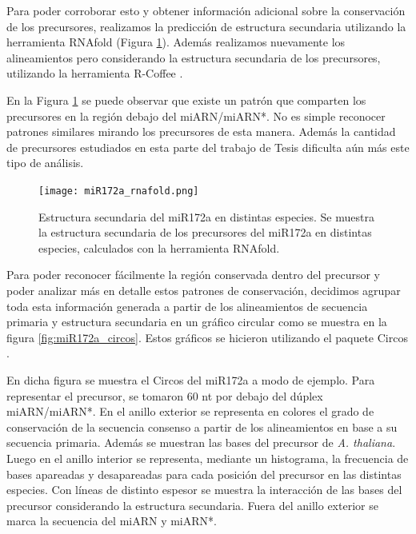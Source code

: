 Para poder corroborar esto y obtener información adicional sobre la conservación de los precursores, realizamos la predicción de estructura secundaria utilizando la herramienta RNAfold \citep{pmid22115189} (Figura \ref{fig:miR172a_rnafold}).
Además realizamos nuevamente los alineamientos pero considerando la estructura secundaria de los precursores, utilizando la herramienta R-Coffee \citep{pmid18292307}.

En la Figura \ref{fig:miR172a_rnafold} se puede observar que existe un patrón que comparten los precursores en la región debajo del miARN/miARN*.
No es simple reconocer patrones similares mirando los precursores de esta manera.
Además la cantidad de precursores estudiados en esta parte del trabajo de Tesis dificulta aún más este tipo de análisis.

\begin{landscape}
    \begin{figure}[htbp!] 
        \centering    
        \texttt{[image: miR172a\_rnafold.png]}
        \caption[Estructura secundaria del miR172a en distintas especies]{
        Estructura secundaria del miR172a en distintas especies.
        Se muestra la estructura secundaria de los precursores del miR172a en distintas especies, calculados con la herramienta RNAfold.
        }
        \label{fig:miR172a_rnafold}
    \end{figure}
\end{landscape}

Para poder reconocer fácilmente la región conservada dentro del precursor y poder analizar más en detalle estos patrones de conservación, decidimos agrupar toda esta información
 generada a partir de los alineamientos de secuencia primaria y estructura secundaria en un gráfico circular como se muestra en la figura \ref{fig:miR172a_circos}.
Estos gráficos se hicieron utilizando el paquete Circos \citep{pmid19541911}.
 
En dicha figura se muestra el Circos del miR172a a modo de ejemplo.
Para representar el precursor, se tomaron 60 nt por debajo del dúplex miARN/miARN*.
En el anillo exterior se representa en colores el grado de conservación de la secuencia consenso a partir de los alineamientos en base a su secuencia primaria.
Además se muestran las bases del precursor de \textit {A. thaliana}.
Luego en el anillo interior se representa, mediante un histograma, la frecuencia de bases apareadas y desapareadas para cada posición del precursor en las distintas especies.
Con líneas de distinto espesor se muestra la interacción de las bases del precursor considerando la estructura secundaria. 
Fuera del anillo exterior se marca la secuencia del miARN y miARN*.

